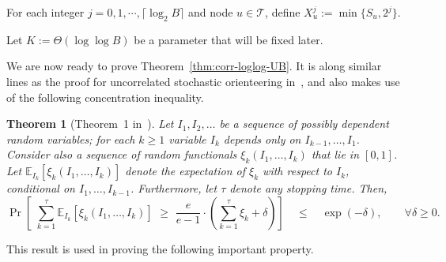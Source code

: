 \documentclass[11pt,letterpaper]{article}
\newtheorem{theorem}{Theorem}[section]
\numberwithin{algorithm}{section}
\newcommand{\T}{\ensuremath{\mathcal{T}}\xspace}
\newcommand{\E}{\mathbb{E}}
\begin{document}
For each integer $j=0,1,\cdots,\lceil \log_2B\rceil$ and node $u\in\T$, define $X^j_u:=\min\{S_u,2^j\}$.


Let $K:=\Theta(\log\log B)$ be a parameter that will be fixed later.

We are now ready to prove Theorem~\ref{thm:corr-loglog-UB}. It is along similar lines as the proof for uncorrelated stochastic orienteering in~\cite{GKNR12}, and also makes use of the following concentration inequality.

\begin{theorem}[Theorem~1 in~\cite{Zhang05}]\label{thm:zhang}
Let $I_1,I_2,\ldots$ be a sequence of possibly dependent random variables; for each $k\ge 1$ variable $I_k$ depends
only on $I_{k-1},\ldots,I_1$. Consider also a sequence of random functionals $\xi_k(I_1,\ldots,I_k)$ that lie in $[0,1]$. Let
$\E_{I_k}[\xi_k(I_1,\ldots,I_k)]$ denote the expectation of $\xi_k$ with respect to $I_k$, conditional on $I_1,\ldots,I_{k-1}$. Furthermore, let
$\tau$ denote any stopping time. Then,
\[ \Pr\left[ \,\,\sum_{k=1}^\tau \E_{I_k}[\xi_k(I_1,\ldots,I_k)] \,\, \ge \,\, \frac{e}{e-1}\cdot \left( \sum_{k=1}^\tau
\xi_k +\delta\right) \right] \quad \le \quad \exp(-\delta), \qquad \forall \delta\ge 0.\]
\end{theorem}




This result is used in proving the following important property.
\end{document}
